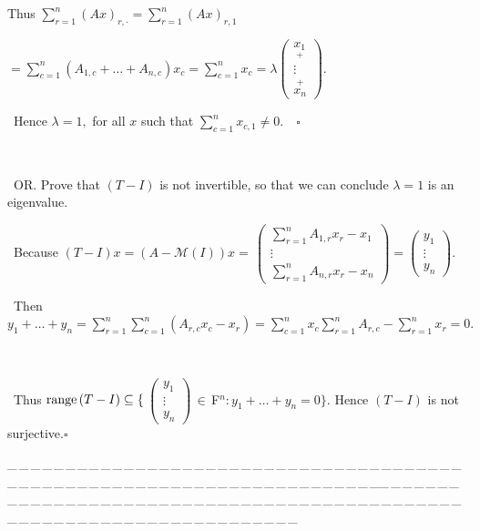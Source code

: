 \documentclass[a4paper, 11pt, UTF8]{article}
\def\range{\textup{range}\,}
\def\Mt{\mathcal{M}}
\def\Fbfc{$\,{\timesbf F}$}
\begin{document}
\begin{large}
Thus $\sum\limits_{r=1}^n (Ax)_{r,\cdot}=\sum\limits_{r=1}^n (Ax)_{r,1}$\par\qquad\qquad\qquad\qquad\quad
$=\sum\limits_{c=1}^n(A_{1,c}+\dots+A_{n,c})x_c=\sum\limits_{c=1}^n x_c=\lambda${\small$\begin{pmatrix}
\underset{+}{x_1}\\ \vdots\\ \overset{+}{x_n}
\end{pmatrix}.$}\par\qquad\,
Hence $\lambda=1,$ for all $x$ such that $\sum\limits_{c=1}^n x_{c,1}\neq 0.\quad\square$\par{\tiny\,\par}\qquad\,
O{\small R.} Prove that $(T-I)$ is not invertible, so that we can conclude $\lambda=1$ is an eigenvalue.\par\qquad\,
Because $(T-I)x=(A-\Mt(I))x=\,${\small$\begin{pmatrix} \sum\limits_{r=1}^n A_{1,r}x_r-x_1\\ \vdots\\ \sum\limits_{r=1}^n A_{n,r}x_r-x_n\end{pmatrix}=\begin{pmatrix} y_1\\ \vdots\\ y_n\end{pmatrix}.$}\par\qquad\,
Then $y_1+\dots+y_n=\sum\limits_{r=1}^n\sum\limits_{c=1}^n (A_{r,c}x_c-x_r)=\sum\limits_{c=1}^n x_c\sum\limits_{r=1}^n A_{r,c}-\sum\limits_{r=1}^n x_r=0.$\par{\tiny\,\par}\qquad\,
Thus $\range(T-I)\subseteq\{\,${\small$\begin{pmatrix}
y_1 \\ \vdots \\ y_n\end{pmatrix}$}$\,\in\Fbfc^n:y_1+\dots+y_n=0\}.$ Hence $(T-I)$ is not surjective.\quad$\square$\par
{\tiny \_\,\_\,\_\,\_\,\_\,\_\,\_\,\_\,\_\,\_\,\_\,\_\,\_\,\_\,\_\,\_\,\_\,\_\,\_\,\_\,\_\,\_\,\_\,\_\,\_\,\_\,\_\,\_\,\_\,\_\,\_\,\_\,\_\,\_\,\_\,\_\,\_\,\_\,\_\,\_\,\_\,\_\,\_\,\_\,\_\,\_\,\_\,\_\,\_\,\_\,\_\,\_\,\_\,\_\,\_\,\_\,\_\,\_\,\_\,\_\,\_\,\_\,\_\,\_\,\_\,\_\,\_\,\_\,\_\,\_\,\_\_\,\_\,\_\,\_\,\_\,\_\,\_\,\_\,\_\,\_\,\_\,\_\,\_\,\_\,\_\,\_\,\_\,\_\,\_\,\_\,\_\,\_\,\_\,\_\,\_\,\_\,\_\,\_\,\_\,\_\,\_\,\_\,\_\,\_\,\_\,\_\,\_\,\_\,\_\,\_\,\_\,\_\,\_\,\_\,\_\,\_\,\_\,\_\,\_\,\_\,\_\,\_\,\_\,\_\,\_\,\_\,\_\,\_\,\_\,\_\,\_\,\_\,\_\,\_\,\_\,\_\,\_\,\_\,\_\,\_\,\_}\par


\end{large}
\end{document}
